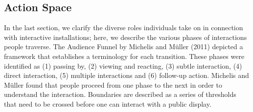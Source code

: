 \subsection* {Action Space}
In the last section, we clarify the diverse roles individuals take on in connection
with interactive installations; here, we describe the various phases of interactions
people traverse. The Audience Funnel by Michelis and Müller (2011) depicted a
framework that establishes a terminology for each transition. These phases were
identified as (1) passing by, (2) viewing and reacting, (3) subtle interaction, (4)
direct interaction, (5) multiple interactions and (6) follow-up action. Michelis and
Müller found that people proceed from one phase to the next in order to understand
the interaction. Boundaries are described as a series of thresholds that need
to be crossed before one can interact with a public display.


